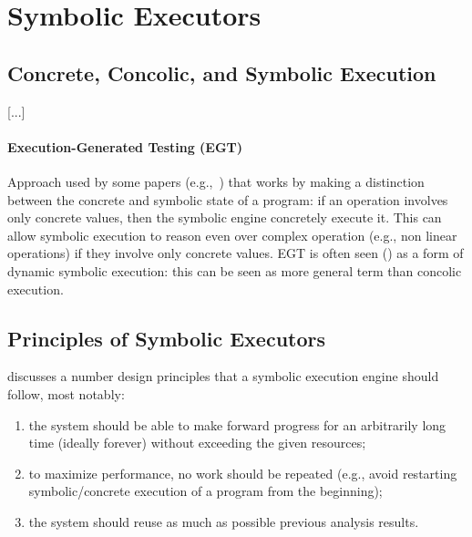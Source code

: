 
\section{Symbolic Executors}
\label{se:executors}

\subsection{Concrete, Concolic, and Symbolic Execution}
\label{ss:concrete-concolic-symbolic}

[...]

\paragraph{Execution-Generated Testing (EGT)} 
 Approach used by some papers (e.g.,~\cite{KLEE-OSDI08,EXE-CCS06}) that works by making a distinction between the concrete and symbolic state of a program: if an operation involves only concrete values, then the symbolic engine concretely execute it. This can allow symbolic execution to reason even over complex operation (e.g., non linear operations) if they involve only concrete values. EGT is often seen (\cite{CS-CACM13}) as a form of dynamic symbolic execution: this can be seen as more general term than concolic execution.

\subsection{Principles of Symbolic Executors}
\label{ss:principles}

\cite{MAYHEM-SP12} discusses a number design principles that a symbolic execution engine should follow, most notably: 
\begin{enumerate}
  \item the system should be able to make forward progress for an arbitrarily long time (ideally forever) without exceeding the given resources;
  \item to maximize performance, no work should be repeated (e.g., avoid restarting symbolic/concrete execution of a program from the beginning);
  \item the system should reuse as much as possible previous analysis results.
\end{enumerate}

